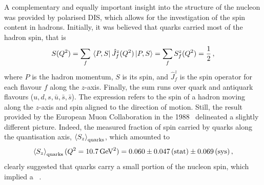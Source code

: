A complementary and equally important insight into the structure of the nucleon was provided by polarised DIS, which allows for the investigation of the spin content in hadrons. Initially, it was believed that quarks carried most of the hadron spin, that is
\begin{equation}
  S(Q^2) = \sum_{f} \bra*{P,S} \hat{J}_f^z(Q^2) \ket*{P,S} = \sum_f S^z_f (Q^2) = \frac{1}{2} \,,
\end{equation}
%
where $P$ is the hadron momentum, $S$ is its spin, and $\hat{J}_f^z$ is the spin operator for each flavour $f$ along the $z$-axis. Finally, the sum runs over quark and antiquark flavours ($u,d,s,\bar{u}, \bar{s}, \bar{s}$). The expression refers to the spin of a hadron moving along the $z$-axis and spin aligned to the direction of motion. Still, the result provided by the European Muon Collaboration in the 1988~\cite{EuropeanMuon:1989yki} delineated a slightly different picture. Indeed, the measured fraction of spin carried by quarks along the quantisation axis, $\left< S_z \right>_{\textrm{quarks}}$, which amounted to
\begin{equation}
  \left< S_z \right>_{\textrm{quarks}} (Q^2 = 10.7 \, \textrm{GeV}^2) = 0.060 \pm 0.047 \, (\textrm{stat}) \pm 0.069 \, (\textrm{sys}) \,,
\end{equation}
clearly suggested that quarks carry a small portion of the nucleon spin, which implied a ~\cite{Leader_Anselmino}.%

